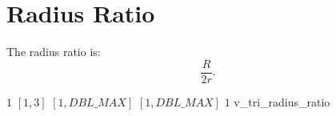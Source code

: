 \section{Radius Ratio}

The radius ratio is: 
\[
\frac{R}{2r}.
\]

%
{$1$}%
{$[1,3]$}%
{$[1,DBL\_MAX]$}%
{$[1,DBL\_MAX]$}%
{$1$}%
{\cite{pebay:03}}%
{v\_tri\_radius\_ratio}%
